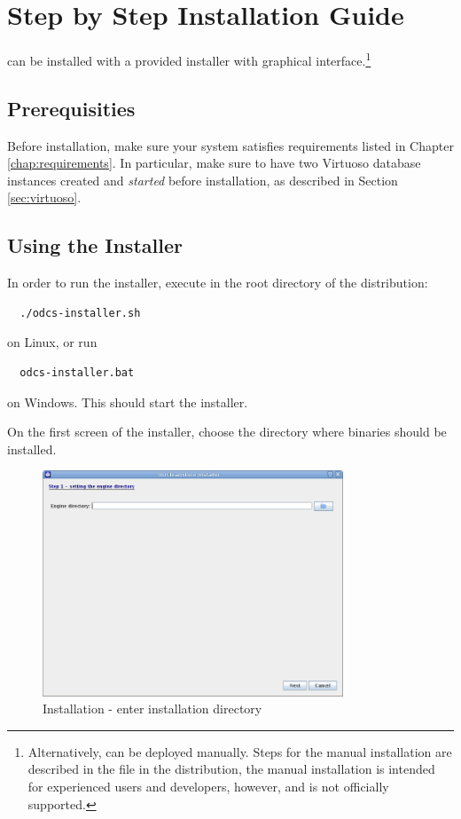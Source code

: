 \chapter{Step by Step Installation Guide}
\odcs can be installed with a provided installer with graphical interface.\footnote{Alternatively, \odcs can be deployed manually. Steps for the manual installation are described in the  file in the distribution, the manual installation is intended for experienced users and developers, however, and is not officially supported.}

\section{Prerequisities}
Before installation, make sure your system satisfies requirements listed in Chapter \ref{chap:requirements}. In particular, make sure to have two Virtuoso database instances created and \textit{started} before installation, as described in Section \ref{sec:virtuoso}.

\section{Using the Installer}
In order to run the installer, execute in the root directory of the distribution:
\begin{verbatim}
  ./odcs-installer.sh
\end{verbatim}
on Linux, or run
\begin{verbatim}
  odcs-installer.bat
\end{verbatim}
on Windows. This should start the installer.

On the first screen of the installer, choose the directory where \odcs binaries should be installed.

\begin{figure}[!h]
    \centering
    \includegraphics[width=0.8\textwidth]{images/install-step-01.png}
    \caption{Installation - enter installation directory}
\end{figure}

